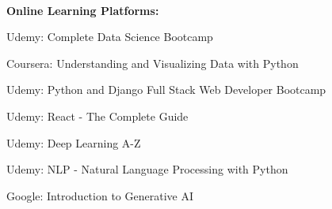 \noindent\\
{\bf Online Learning Platforms:} 


\begin{itemize*}[noitemsep]
    \item Udemy: Complete Data Science Bootcamp
    \item Coursera: Understanding and Visualizing Data with Python
    \item Udemy: Python and Django Full Stack Web Developer Bootcamp
    \item Udemy: React - The Complete Guide
    \item Udemy: Deep Learning A-Z
    \item Udemy: NLP - Natural Language Processing with Python
    \item Google: Introduction to Generative AI
\end{itemize*}